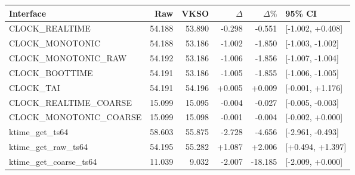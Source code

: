 \begin{tabular}{lrrrrl}
\toprule
Interface & Raw & VKSO & $\Delta$ & $\Delta\%$ & 95\% CI \\
\midrule
CLOCK\_REALTIME & 54.188 & 53.890 & -0.298 & -0.551 & [-1.002, +0.408] \\
CLOCK\_MONOTONIC & 54.188 & 53.186 & -1.002 & -1.850 & [-1.003, -1.002] \\
CLOCK\_MONOTONIC\_RAW & 54.192 & 53.186 & -1.006 & -1.856 & [-1.007, -1.004] \\
CLOCK\_BOOTTIME & 54.191 & 53.186 & -1.005 & -1.855 & [-1.006, -1.005] \\
CLOCK\_TAI & 54.191 & 54.196 & +0.005 & +0.009 & [-0.001, +1.176] \\
CLOCK\_REALTIME\_COARSE & 15.099 & 15.095 & -0.004 & -0.027 & [-0.005, -0.003] \\
CLOCK\_MONOTONIC\_COARSE & 15.099 & 15.098 & -0.001 & -0.004 & [-0.002, +0.000] \\
ktime\_get\_ts64 & 58.603 & 55.875 & -2.728 & -4.656 & [-2.961, -0.493] \\
ktime\_get\_raw\_ts64 & 54.195 & 55.282 & +1.087 & +2.006 & [+0.494, +1.397] \\
ktime\_get\_coarse\_ts64 & 11.039 & 9.032 & -2.007 & -18.185 & [-2.009, +0.000] \\
\bottomrule
\end{tabular}
